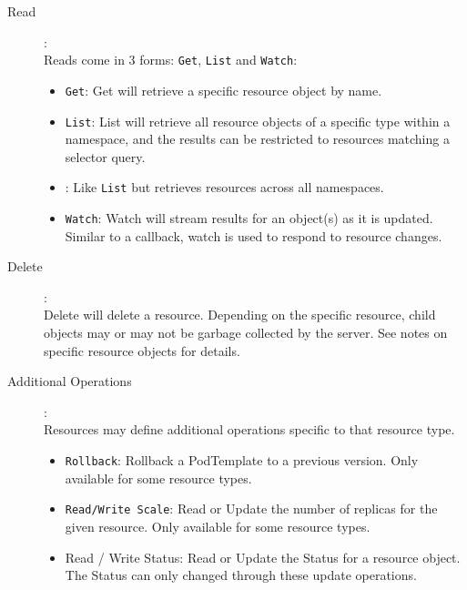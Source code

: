 \begin{description}
	\item [Read]{:}\\
	Reads come in 3 forms: \texttt{Get}, \texttt{List} and \texttt{Watch}:
	\begin{itemize}
		\item \texttt{Get}: Get will retrieve a specific resource object by name.
		\item \texttt{List}: List will retrieve all resource objects of a specific type within a namespace, and the results can be restricted to resources matching a selector query.
		\item {}: Like \texttt{List} but retrieves resources across all namespaces.
		\item \texttt{Watch}: Watch will stream results for an object(s) as it is updated.  Similar to a callback, watch is used to respond to resource changes.
	\end{itemize}

	\item [Delete]{:}\\
Delete will delete a resource.  Depending on the specific resource, child objects may or may not be garbage collected by the server.  See
notes on specific resource objects for details.

	\item [Additional Operations]{:}\\
	Resources may define additional operations specific to that resource type.
	\begin{itemize}
		\item \texttt{Rollback}: Rollback a PodTemplate to a previous version.  Only available for some resource types.
		\item \texttt{Read/Write Scale}: Read or Update the number of replicas for the given resource.  Only available for some resource types.
		\item \textsf{Read / Write Status}: Read or Update the Status for a resource object.  The Status can only changed through these update operations.
	\end{itemize}
\end{description}

